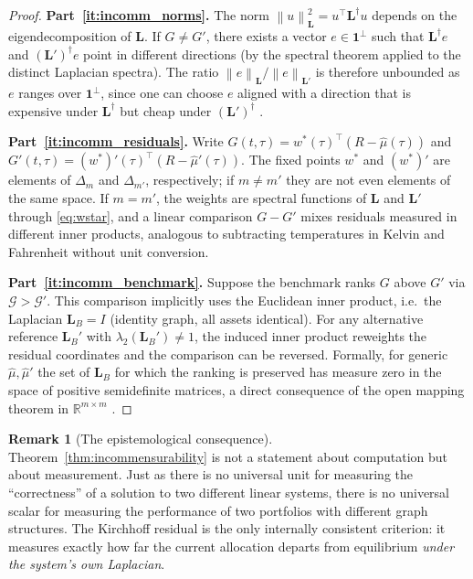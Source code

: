 \documentclass[twocolumn,11pt,a4paper]{article}
\theoremstyle{plain}
\theoremstyle{definition}
\newtheorem{remark}[theorem]{Remark}
\theoremstyle{remark}
\newcommand{\R}{\mathbb{R}}
\newcommand{\Lop}{\mathbf{L}}        %
\newcommand{\Lpinv}{\mathbf{L}^{\dagger}} %
\newcommand{\wstar}{w^{*}}
\newcommand{\Deltam}{\Delta_m}
\newcommand{\lamtwo}{\lambda_2}
\newcommand{\norm}[1]{\left\|#1\right\|}
\newcommand{\one}{\mathbf{1}}
\newcommand{\Gain}{\mathcal{G}}
\begin{document}
\begin{proof}
  \textbf{Part~\ref{it:incomm_norms}.}  The norm
  $\norm{u}_{\Lop}^2=u^{\top}\Lpinv u$ depends on the eigendecomposition
  of $\Lop$.  If $G\ne G'$, there exists a vector $e\in\one^{\perp}$
  such that $\Lpinv e$ and $(\Lop')^{\dagger}e$ point in different
  directions (by the spectral theorem applied to the distinct Laplacian
  spectra).  The ratio $\norm{e}_{\Lop}/\norm{e}_{\Lop'}$ is therefore
  unbounded as $e$ ranges over $\one^{\perp}$, since one can choose $e$
  aligned with a direction that is expensive under $\Lpinv$ but cheap
  under $(\Lop')^{\dagger}$ \cite{HornJohnson1985}.

  \textbf{Part~\ref{it:incomm_residuals}.}  Write
  $G(t,\tau)=\wstar(\tau)^{\top}(R-\hat\mu(\tau))$ and
  $G'(t,\tau)=(\wstar)'(\tau)^{\top}(R-\hat\mu'(\tau))$.  The fixed
  points $\wstar$ and $(\wstar)'$ are elements of $\Deltam$ and
  $\Delta_{m'}$, respectively; if $m\ne m'$ they are not even elements
  of the same space.  If $m=m'$, the weights are spectral functions
  of $\Lop$ and $\Lop'$ through \eqref{eq:wstar}, and a linear
  comparison $G-G'$ mixes residuals measured in different inner
  products, analogous to subtracting temperatures in Kelvin and
  Fahrenheit without unit conversion.

  \textbf{Part~\ref{it:incomm_benchmark}.}  Suppose the benchmark
  ranks $G$ above $G'$ via $\Gain>\Gain'$.  This comparison
  implicitly uses the Euclidean inner product, i.e.~the Laplacian
  $\Lop_B=I$ (identity graph, all assets identical).  For any
  alternative reference $\Lop_B'$ with $\lamtwo(\Lop_B')\ne 1$,
  the induced inner product reweights the residual coordinates and
  the comparison can be reversed.  Formally, for generic
  $\hat\mu,\hat\mu'$ the set of $\Lop_B$ for which the ranking is
  preserved has measure zero in the space of positive semidefinite
  matrices, a direct consequence of the open mapping theorem in
  $\R^{m\times m}$ \cite{GolubVanLoan1996}.
\end{proof}

\begin{remark}[The epistemological consequence]
  Theorem~\ref{thm:incommensurability} is not a statement about
  computation but about measurement.  Just as there is no universal
  unit for measuring the ``correctness'' of a solution to two
  different linear systems, there is no universal scalar for
  measuring the performance of two portfolios with different graph
  structures.  The Kirchhoff residual is the only internally
  consistent criterion: it measures exactly how far the current
  allocation departs from equilibrium \emph{under the system's own
  Laplacian}.
\end{remark}
\end{document}
